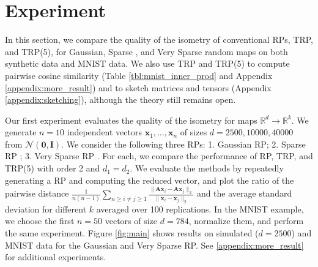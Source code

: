 \section{Experiment} \label{sec:simulation}
In this section, we compare the quality of the isometry of
conventional RPs, TRP, and TRP(5), for
Gaussian, Sparse \cite{achlioptas2003database},
and Very Sparse random maps \cite{li2006very} on both synthetic data and MNIST data.
We also use TRP and TRP(5) to compute pairwise cosine similarity
(Table \ref{tbl:mnist_inner_prod} and Appendix \ref{appendix:more_result})
and to sketch matrices and tensors
(Appendix \ref{appendix:sketching}),
although the theory still remains open.

Our first experiment evaluates the quality of the isometry for maps $\mathbb{R}^d \to \mathbb{R}^k$.
We generate $n=10$ independent vectors $\mathbf{x}_1, \dots, \mathbf{x}_n$ of sizes
$d = 2500, 10000, 40000$ from $\mathcal{N}(\mathbf{0},\mathbf{I})$.
We consider the following three RPs:
1. Gaussian RP; 2. Sparse RP \cite{achlioptas2003database}; 3. Very Sparse RP \cite{li2006very}.
For each, we compare the performance of RP, TRP, and TRP(5) with order 2 and $d_1=d_2$.
We evaluate the methods by repeatedly generating a RP and computing the reduced vector,
and plot the ratio of the pairwise distance
$\frac{1}{n(n-1)}\sum_{n \geq i\neq j \geq 1}\frac{\|\mathbf{A}\mathbf{x}_i - \mathbf{A}\mathbf{x}_j\|_2}{\|\mathbf{x}_i - \mathbf{x}_j\|_2}$
and the average standard deviation for different $k$
averaged over 100 replications.
In the MNIST example, we choose the first $n = 50$ vectors of size $d = 784$, normalize them,
and perform the same experiment.
Figure \ref{fig:main} shows results on simulated ($d = 2500$) and MNIST data
for the Gaussian and Very Sparse RP.
See \ref{appendix:more_result} for additional experiments.

